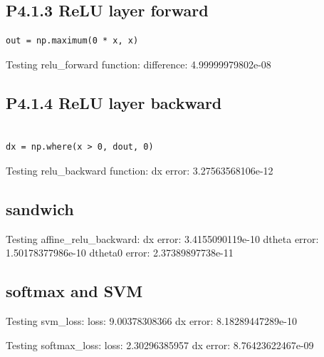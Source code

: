 \documentclass[12pt]{article}
\begin{document}
\subsection*{P4.1.3 ReLU layer forward}
\begin{lstlisting}
out = np.maximum(0 * x, x)
\end{lstlisting}

Testing relu\_forward function:
difference:  4.99999979802e-08

\subsection*{P4.1.4 ReLU layer backward}
\begin{lstlisting}

dx = np.where(x > 0, dout, 0)
\end{lstlisting}
Testing relu\_backward function:
dx error:  3.27563568106e-12


\subsection*{sandwich}
Testing affine\_relu\_backward:
dx error:  3.4155090119e-10
dtheta error:  1.50178377986e-10
dtheta0 error:  2.37389897738e-11

\subsection*{softmax and SVM}
Testing svm\_loss:
loss:  9.00378308366
dx error:  8.18289447289e-10

Testing softmax\_loss:
loss:  2.30296385957
dx error:  8.76423622467e-09
\end{document}

